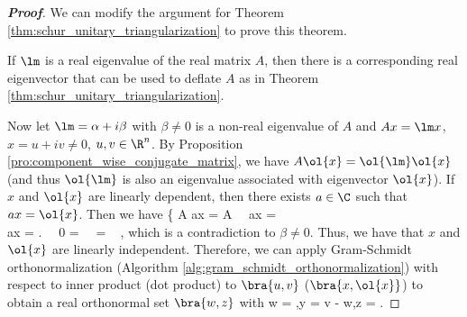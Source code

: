\begin{proof}[\bf Proof]
We can modify the argument for Theorem \ref{thm:schur_unitary_triangularization} to prove this theorem.

If $\lm$ is a real eigenvalue of the real matrix $A$, then there is a corresponding real eigenvector that can be used to deflate $A$ as in Theorem \ref{thm:schur_unitary_triangularization}.

Now let $\lm = \alpha + i\beta$ with $\beta \neq 0$ is a non-real eigenvalue of $A$ and $Ax = \lm x$, $x = u + iv\neq 0$, $u,v\in \R^n$. By Proposition \ref{pro:component_wise_conjugate_matrix}, we have $A\ol{x} =
\ol{\lm} \ol{x}$ (and thus $\ol{\lm}$ is also an eigenvalue associated with eigenvector $\ol{x}$). If $x$ and $\ol{x}$ are linearly dependent, then there exists $a\in \C$ such that $ax = \ol{x}$. Then we have
\be
\left\{
A ax = A \ \ra \ a\lm x = \ol{\lm} \\
a\lm x = \lm {} \ea\right.  \ \ra \ 0 = \brb{\lm - \ol{\lm}} \ \ra \ \lm = \ol{\lm} \quad {}\  ,
\ee
which is a contradiction to $\beta \neq 0$. Thus, we have that $x$ and $\ol{x}$ are linearly independent. Therefore, we can apply Gram-Schmidt orthonormalization (Algorithm
\ref{alg:gram_schmidt_orthonormalization}) with respect to inner product (dot product) to $\bra{u,v}$ ($\bra{x,\ol{x}}$) to obtain a real orthonormal set $\bra{w,z}$ with
\be
w = ,\quad y = v - w,\quad z = .   %
\ee


\end{proof}
